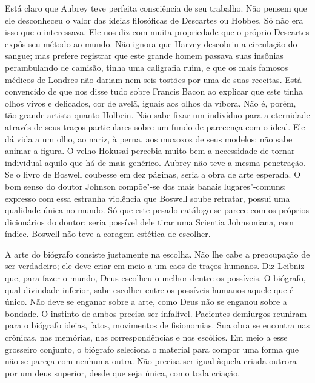 Está claro que Aubrey teve perfeita consciência de seu trabalho. Não pensem
que ele desconheceu o valor das ideias filosóficas de Descartes ou Hobbes.
Só não era isso que o interessava. Ele nos diz com muita propriedade que o
próprio Descartes expôs seu método ao mundo. Não ignora que Harvey
descobriu a circulação do sangue; mas prefere registrar que este grande
homem passava suas insônias perambulando de camisão, tinha uma caligrafia
ruim, e que os mais famosos médicos de Londres não dariam nem seis tostões
por uma de suas receitas. Está convencido de que nos disse tudo sobre
Francis Bacon ao explicar que este tinha olhos vivos e delicados, cor de
avelã, iguais aos olhos da víbora. Não é, porém, tão grande artista quanto
Holbein. Não sabe fixar um indivíduo para a eternidade através de seus
traços particulares sobre um fundo de parecença com o ideal. Ele dá vida a
um olho, ao nariz, à perna, aos muxoxos de seus modelos: não sabe animar a
figura. O velho Hokusai percebia muito bem a necessidade de tornar
individual aquilo que há de mais genérico. Aubrey não teve a mesma
penetração. Se o livro de Boswell coubesse em dez páginas, seria a obra de
arte esperada. O bom senso do doutor Johnson compõe"-se dos mais banais
lugares"-comuns; expresso com essa estranha violência que Boswell soube
retratar, possui uma qualidade única no mundo. Só que este pesado catálogo
se parece com os próprios dicionários do doutor; seria possível dele tirar
uma Scientia Johnsoniana, com índice. Boswell não teve a coragem estética de escolher.

A arte do biógrafo consiste justamente na escolha. Não lhe cabe a
preocupação de ser verdadeiro; ele deve criar em meio a um caos de traços
humanos. Diz Leibniz que, para fazer o mundo, Deus escolheu o melhor
dentre os possíveis. O biógrafo, qual divindade inferior, sabe escolher
entre os possíveis humanos aquele que é único. Não deve se enganar sobre a
arte, como Deus não se enganou sobre a bondade. O instinto de ambos
precisa ser infalível. Pacientes demiurgos reuniram para o biógrafo
ideias, fatos, movimentos de fisionomias. Sua obra se encontra nas
crônicas, nas memórias, nas correspondências e nos escólios. Em meio a
esse grosseiro conjunto, o biógrafo seleciona o material para compor uma
forma que não se pareça com nenhuma outra. Não precisa ser igual àquela
criada outrora por um deus superior, desde que seja única, como toda criação.

